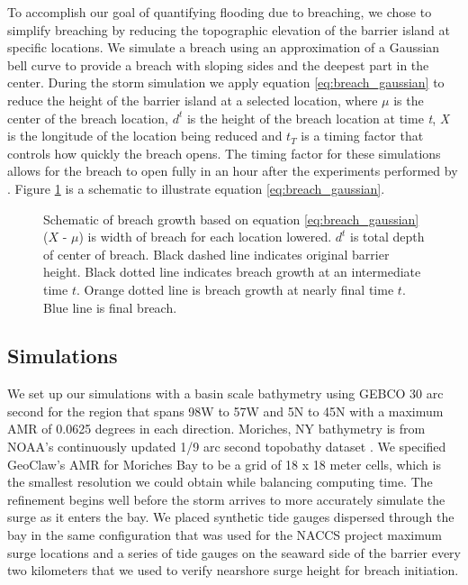 \documentclass{coastal_paper}
\begin{document}
To accomplish our goal of quantifying flooding due to breaching, we chose to simplify breaching by reducing the topographic elevation of the barrier island at specific locations. We simulate a breach using an approximation of a Gaussian bell curve to provide a breach with sloping sides and the deepest part in the center. During the storm simulation we apply equation \ref{eq:breach_gaussian} to reduce the height of the barrier island at a selected location, where \emph{$\mu$} is the center of the breach location, \emph{$d^t$} is the height of the breach location at time \emph{t}, \emph{X} is the longitude of the location being reduced and \emph{$t_T$} is a timing factor that controls how quickly the breach opens. The timing factor for these simulations allows for the breach to open fully in an hour after the experiments performed by \citet{visser1999breach}. Figure \ref{fig:2} is a schematic to illustrate equation \ref{eq:breach_gaussian}.

\begin{figure}[ht]
    \centering
    \resizebox{\textwidth}{!}{%
            
        }
    \caption{Schematic of breach growth based on equation \ref{eq:breach_gaussian} ($X$ - $\mu$) is width of breach for each location lowered. $d^t$ is total depth of center of breach. Black dashed line indicates original barrier height. Black dotted line indicates breach growth at an intermediate time $t$. Orange dotted line is breach growth at nearly final time $t$. Blue line is final breach.}
    \label{fig:2}
\end{figure}

\subsection{Simulations} 
We set up our simulations with a basin scale bathymetry using GEBCO 30 arc second \citep{weatherall2015new} for the region that spans 98W to 57W and 5N to 45N with a maximum AMR of 0.0625 degrees in each direction. Moriches, NY bathymetry is from NOAA's continuously updated 1/9 arc second topobathy dataset \citep{Cooperative_Institute_for_Research_in_Environmental_Sciences2014-ix}. We specified GeoClaw's AMR for Moriches Bay to be a grid of 18 x 18 meter cells, which is the smallest resolution we could obtain while balancing computing time. The refinement begins well before the storm arrives to more accurately simulate the surge as it enters the bay. We placed synthetic tide gauges dispersed through the bay in the same configuration that was used for the NACCS project maximum surge locations \citep{cialone2015north} and a series of tide gauges on the seaward side of the barrier every two kilometers that we used to verify nearshore surge height for breach initiation.
\end{document}
